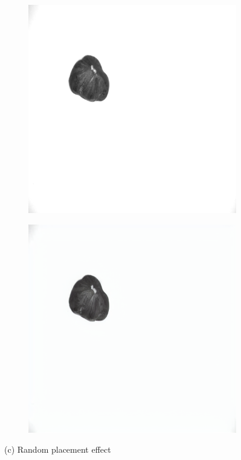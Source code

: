 \documentclass[12pt,DIV14,BCOR12mm,a4paper,footinclude=false,headinclude,parskip=half-,twoside,openright,cleardoublepage=empty,toc=index,bibliography=totoc,listof=totoc]{scrreprt}
\numberwithin{equation}{chapter}
\begin{document}
\begin{figure}
    \vspace{0.3cm} %

    \begin{subfigure}[t]{0.45\textwidth}
        \centering
        \includegraphics[width=\textwidth]{../media/diff_nuts_random_real.png}
    \end{subfigure}%
    \hspace{0.02\textwidth}%
    \begin{subfigure}[t]{0.45\textwidth}
        \centering
        \includegraphics[width=\textwidth]{../media/diff_nuts_random_fake.png}
    \end{subfigure}
    \caption*{(c) Random placement effect}

\end{figure}
\end{document}

